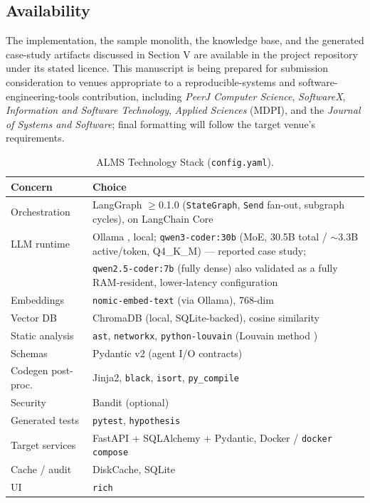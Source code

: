 \documentclass[conference]{IEEEtran}
\begin{document}
\subsection{Availability}

The implementation, the sample monolith, the knowledge base, and the generated case-study artifacts discussed in Section V are available in the project repository under its stated licence. This manuscript is being prepared for submission consideration to venues appropriate to a reproducible-systems and software-engineering-tools contribution, including \emph{PeerJ Computer Science}, \emph{SoftwareX}, \emph{Information and Software Technology}, \emph{Applied Sciences} (MDPI), and the \emph{Journal of Systems and Software}; final formatting will follow the target venue's requirements.

\begin{table}[t]
\centering
\caption{ALMS Technology Stack (\texttt{config.yaml}).}
\label{tab:stack}
\begin{tabular}{ll}
\toprule
\textbf{Concern} & \textbf{Choice} \\
\midrule
Orchestration & LangGraph $\geq$0.1.0 \cite{langgraph2024} (\texttt{StateGraph}, \texttt{Send} fan-out, subgraph cycles), on LangChain Core \\
LLM runtime & Ollama \cite{ollama2024}, local; \texttt{qwen3-coder:30b} (MoE, 30.5B total / $\sim$3.3B active/token, Q4\_K\_M) --- reported case study; \\
 & \texttt{qwen2.5-coder:7b} (fully dense) also validated as a fully RAM-resident, lower-latency configuration \\
Embeddings & \texttt{nomic-embed-text} (via Ollama), 768-dim \\
Vector DB & ChromaDB (local, SQLite-backed), cosine similarity \\
Static analysis & \texttt{ast}, \texttt{networkx}, \texttt{python-louvain} \cite{aynaud2020} (Louvain method \cite{blondel2008}) \\
Schemas & Pydantic v2 (agent I/O contracts) \\
Codegen post-proc. & Jinja2, \texttt{black}, \texttt{isort}, \texttt{py\_compile} \\
Security & Bandit (optional) \\
Generated tests & \texttt{pytest}, \texttt{hypothesis} \cite{maciver2019} \\
Target services & FastAPI + SQLAlchemy + Pydantic, Docker / \texttt{docker compose} \\
Cache / audit & DiskCache, SQLite \\
UI & \texttt{rich} \\
\bottomrule
\end{tabular}
\end{table}
\end{document}
